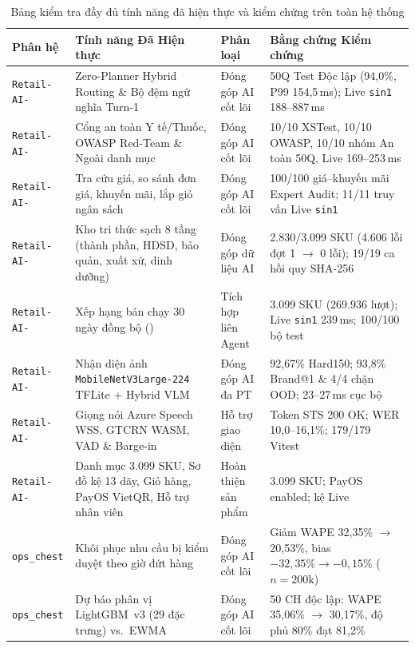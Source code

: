 \begin{table}[H]
\centering
\caption{Bảng kiểm tra đầy đủ tính năng đã hiện thực và kiểm chứng trên toàn hệ thống}
\label{tab:feature_completeness}
\scriptsize
\setlength{\tabcolsep}{3.5pt}
\begin{tabularx}{\textwidth}{L{2.2cm} L{3.6cm} L{2.3cm} Y}
\toprule
\textbf{Phân hệ} & \textbf{Tính năng Đã Hiện thực} & \textbf{Phân loại} & \textbf{Bằng chứng Kiểm chứng} \\
\midrule
\texttt{Retail-AI-} & Zero-Planner Hybrid Routing \& Bộ đệm ngữ nghĩa Turn-1 & Đóng góp AI cốt lõi & 50Q Test Độc lập (94,0\%, P99 154,5\,ms); Live \texttt{sin1} 188--887\,ms \\
\texttt{Retail-AI-} & Cổng an toàn Y tế/Thuốc, OWASP Red-Team \& Ngoài danh mục & Đóng góp AI cốt lõi & 10/10 XSTest, 10/10 OWASP, 10/10 nhóm An toàn 50Q, Live 169--253\,ms \\
\texttt{Retail-AI-} & Tra cứu giá, so sánh đơn giá, khuyến mãi, lắp giỏ ngân sách & Đóng góp AI cốt lõi & 100/100 giá--khuyến mãi Expert Audit; 11/11 truy vấn Live \texttt{sin1} \\
\texttt{Retail-AI-} & Kho tri thức sạch 8 tầng (thành phần, HDSD, bảo quản, xuất xứ, dinh dưỡng) & Đóng góp dữ liệu AI & 2.830/3.099 SKU (4.606 lỗi đợt 1 $\to$ 0 lỗi); 19/19 ca hồi quy SHA-256 \\
\texttt{Retail-AI-} & Xếp hạng bán chạy 30 ngày đồng bộ () & Tích hợp liên Agent & 3.099 SKU (269.936 lượt); Live \texttt{sin1} 239\,ms; 100/100 bộ test \\
\texttt{Retail-AI-} & Nhận diện ảnh \texttt{MobileNetV3Large-224} TFLite + Hybrid VLM & Đóng góp AI đa PT & 92,67\% Hard150; 93,8\% Brand@1 \& 4/4 chặn OOD; 23--27\,ms cục bộ \\
\texttt{Retail-AI-} & Giọng nói Azure Speech WSS, GTCRN WASM, VAD \& Barge-in & Hỗ trợ giao diện & Token STS 200 OK; WER 10,0--16,1\%; 179/179 Vitest \\
\texttt{Retail-AI-} & Danh mục 3.099 SKU, Sơ đồ kệ 13 dãy, Giỏ hàng, PayOS VietQR, Hỗ trợ nhân viên & Hoàn thiện sản phẩm &  3.099 SKU; PayOS enabled; kệ  Live \\
\midrule
\texttt{ops\_chest} & Khôi phục nhu cầu bị kiểm duyệt theo giờ đứt hàng & Đóng góp AI cốt lõi & Giảm WAPE 32,35\% $\to$ 20,53\%, bias $-32{,}35\% \to -0{,}15\%$ ($n=200\text{k}$) \\
\texttt{ops\_chest} & Dự báo phân vị LightGBM~v3 (29 đặc trưng) vs.\ EWMA & Đóng góp AI cốt lõi & 50 CH độc lập: WAPE 35,06\% $\to$ 30,17\%, độ phủ 80\% đạt 81,2\% \\

\end{tabularx}
\end{table}
